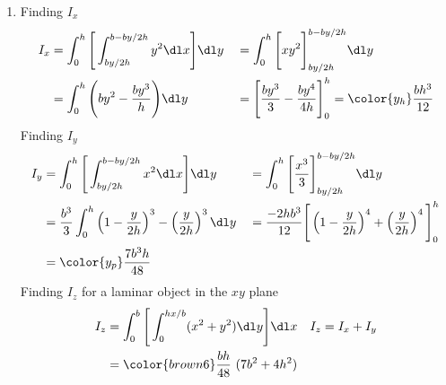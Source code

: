 \begin{enumerate}
    \item Finding $ I_x $
          \begin{align}
              I_x   & = \int_{0}^{h} \Bigg[\int_{by/2h}^{b - by/2h} y^2 \dl x \Bigg]
              \dl y &
                    & = \int_{0}^{h} \Bigg[xy^2\Bigg]_{by/2h}^{b - by/2h} \dl y        \\
                    & = \int_{0}^{h} \Bigg(by^2 - \frac{by^3}{h}\Bigg) \dl y         &
                    & = \Bigg[ \frac{by^3}{3} - \frac{by^4}{4h} \Bigg]_0^h
              = \color{y_h} \frac{bh^3}{12}
          \end{align}
          Finding $ I_y $
          \begin{align}
              I_y   & = \int_{0}^{h} \Bigg[\int_{by/2h}^{b - by/2h} x^2 \dl x \Bigg]
              \dl y &
                    & = \int_{0}^{h} \Bigg[ \frac{x^3}{3} \Bigg]_{by/2h}^{b - by/2h}
              \dl y                                                                   \\
                    & = \frac{b^3}{3} \int_{0}^{h} \left( 1 - \frac{y}{2h}\right)^3 -
              \left( \frac{y}{2h} \right)^3
              \dl y &
                    & = \frac{-2hb^3}{12} \Bigg[\left( 1 - \frac{y}{2h} \right)^4
              + \left( \frac{y}{2h} \right)^4 \Bigg]_0^h                              \\
                    & = \color{y_p} \frac{7b^3h}{48}
          \end{align}
          Finding $ I_z $ for a laminar object in the $ xy $ plane
          \begin{align}
              I_z   & = \int_{0}^{b} \Bigg[\int_{0}^{hx/b} (x^2 + y^2) \dl y\Bigg]
              \dl x &
              I_z   & = I_x + I_y                                                  \\
                    & = \color{brown6} \frac{bh}{48}\ (7b^2 + 4h^2)
          \end{align}


\end{enumerate}

